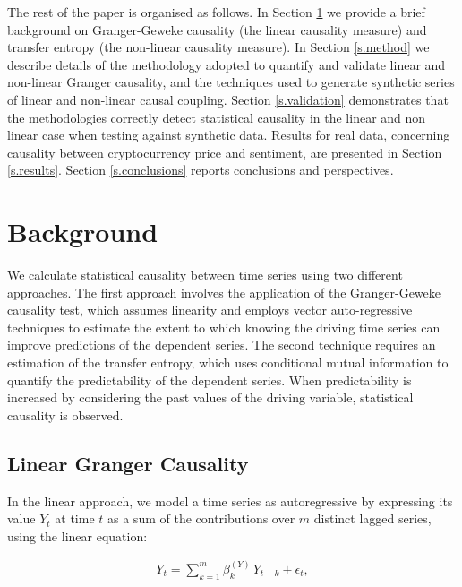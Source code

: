 \documentclass[]{rsos}%
\begin{document}
 The rest of the paper is organised as follows. In Section \ref{s.background} we provide a brief background on {\color{blue}Granger-Geweke causality} ({\color{blue}the} linear causality measure) and transfer entropy ({\color{blue}the} non-linear causality measure). In Section \ref{s.method} we describe details of the methodology adopted to quantify and validate linear and non-linear {\color{blue}Granger} causality, and the techniques used to generate synthetic series of linear and non-linear causal coupling. Section \ref{s.validation} demonstrates that the methodologies correctly detect {\color{blue}statistical} causality in the linear and non linear case when testing against synthetic data. Results for real data, concerning causality between cryptocurrency price and sentiment, are presented in Section \ref{s.results}. Section \ref{s.conclusions} reports conclusions and perspectives.


\section{Background} \label{s.background}  

  We calculate statistical causality between time series using two different approaches. The first approach involves the application of the Granger-Geweke causality test, which assumes linearity and employs vector auto-regressive techniques to estimate the extent to which knowing the driving time series can improve predictions of the dependent series. The second technique requires an estimation of the transfer entropy, which uses conditional mutual information to quantify the predictability of the dependent series. When predictability is increased by considering the past values of the driving variable, statistical causality is observed.
  
  \subsection{Linear {\color{blue}Granger} Causality}
  
  In the linear approach, we model a time series as autoregressive by expressing its value $Y_t$ at time $t$ as a sum of the contributions over $m$ distinct lagged series, using the linear equation:

  \begin{eqnarray}
    \label{eq:autoregression1}
    Y_t = \sum_{k=1}^m \beta_{k}^{(Y)} \, Y_{t-k} + \epsilon_t ,
  \end{eqnarray}
\end{document}
